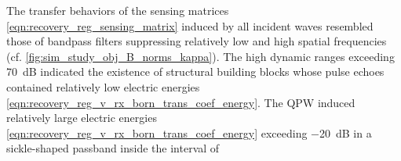 The transfer behaviors of
the sensing matrices
\eqref{eqn:recovery_reg_sensing_matrix} induced by
all incident waves resembled those of
bandpass filters suppressing
relatively low and high
spatial frequencies
(cf. \cref{fig:sim_study_obj_B_norms_kappa}).
The high dynamic ranges exceeding
\SI{70}{\deci\bel} indicated
the existence of
structural building blocks whose
pulse echoes contained
relatively low electric energies
\eqref{eqn:recovery_reg_v_rx_born_trans_coef_energy}.
The \ac{QPW} induced
relatively large electric energies
\eqref{eqn:recovery_reg_v_rx_born_trans_coef_energy} exceeding
\SI{-20}{\deci\bel} in
a sickle-shaped passband inside
the interval of

